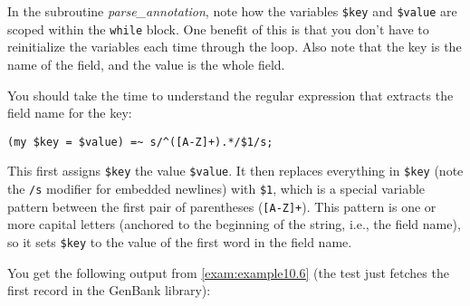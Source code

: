 In the subroutine \textit{parse\_annotation}, note how the variables \verb|$key| and \verb|$value| are scoped within the \verb|while| block. One benefit of this is that you don't have to reinitialize the variables each time through the loop. Also note that the key is the name of the field, and the value is the whole field.

You should take the time to understand the regular expression that extracts the field name for the key:

\begin{lstlisting}
(my $key = $value) =~ s/^([A-Z]+).*/$1/s;
\end{lstlisting}

This first assigns \verb|$key| the value \verb|$value|. It then replaces everything in \verb|$key| (note the \verb|/s| modifier for embedded newlines) with \verb|$1|, which is a special variable pattern between the first pair of parentheses (\verb|[A-Z]+|).  This pattern is one or more capital letters (anchored to the beginning of the string, i.e., the field name), so it sets \verb|$key| to the value of the first word in the field name.

You get the following output from \autoref{exam:example10.6} (the test just fetches the first record in the GenBank library):

